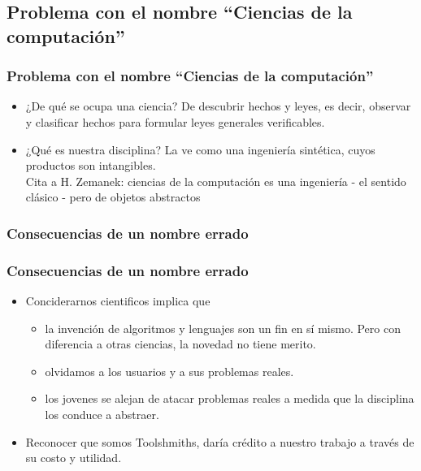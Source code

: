 \documentclass{beamer}
\begin{document}
  \subsection{Problema con el nombre ``Ciencias de la computación''}
    \begin{frame}
      \frametitle{Problema con el nombre ``Ciencias de la computación''}
      \begin{itemize}
	\item ¿De qué se ocupa una ciencia? De descubrir hechos y leyes, es decir, observar y clasificar hechos para formular leyes generales verificables.
	\item ¿Qué es nuestra disciplina? La ve como una ingeniería sintética, cuyos productos son intangibles. \\
	Cita a H. Zemanek: ciencias de la computación es una ingeniería - el sentido clásico - pero de objetos abstractos
  \end{itemize}    
\end{frame}

\subsubsection{Consecuencias de un nombre errado}
    \begin{frame}
      \frametitle{Consecuencias de un nombre errado}
      \begin{itemize}
	\item Conciderarnos cientificos implica que
	\begin{itemize}
		\item  la invenci\'on de algoritmos y lenguajes son un fin en s\'i mismo. Pero con diferencia a otras ciencias, la novedad no tiene merito.
		\item  olvidamos a los usuarios y a sus problemas reales.
		\item los jovenes se alejan de atacar problemas reales a medida que la disciplina los conduce a abstraer.
	\end{itemize}	
	\item Reconocer que somos Toolshmiths, dar\'ia cr\'edito a nuestro trabajo a trav\'es de su costo y utilidad.

  \end{itemize}    
\end{frame}
\end{document}
